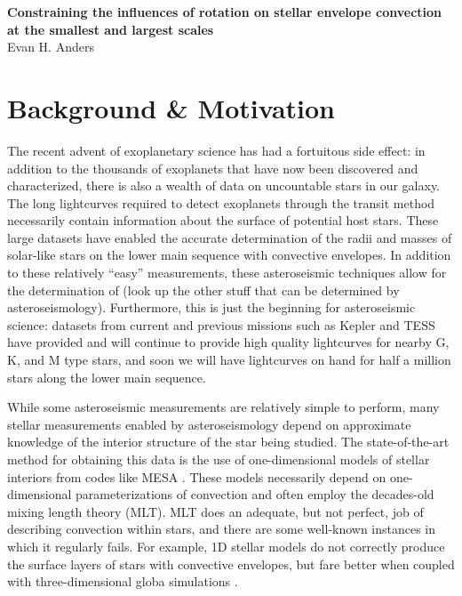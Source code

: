 \documentclass[aasms,12pt]{article}
\begin{document}
\begin{center}
   \large\textbf{Constraining the influences of rotation on stellar envelope convection at the smallest and largest scales}\\
   \vspace{0.2cm}
   \large{Evan H. Anders}\\
   \vspace{0.2cm}
\end{center}

\vspace{-0.6cm}

\section{Background \& Motivation}
The recent advent of exoplanetary science has had a fortuitous side effect: in addition to the thousands of exoplanets that have now been discovered and characterized, there is also a wealth of data on uncountable stars in our galaxy.
The long lightcurves required to detect exoplanets through the transit method necessarily contain information about the surface of potential host stars.
These large datasets have enabled the accurate determination of the radii and masses of solar-like stars on the lower main sequence with convective envelopes.
In addition to these relatively ``easy'' measurements, these asteroseismic techniques allow for the determination of (look up the other stuff that can be determined by asteroseismology).
Furthermore, this is just the beginning for asteroseismic science: datasets from current and previous missions such as Kepler and TESS have provided and will continue to provide high quality lightcurves for nearby G, K, and M type stars, and soon we will have lightcurves on hand for half a million stars along the lower main sequence.

While some asteroseismic measurements are relatively simple to perform, many stellar measurements enabled by asteroseismology depend on approximate knowledge of the interior structure of the star being studied.
The state-of-the-art method for obtaining this data is the use of one-dimensional models of stellar interiors from codes like MESA \citep{paxton&all2011}.
These models necessarily depend on one-dimensional parameterizations of convection and often employ the decades-old mixing length theory (MLT).
MLT does an adequate, but not perfect, job of describing convection within stars, and there are some well-known instances in which it regularly fails.
For example, 1D stellar models do not correctly produce the surface layers of stars with convective envelopes, but fare better when coupled with three-dimensional globa simulations \citep{jorgensen&weiss2019}.
\end{document}
